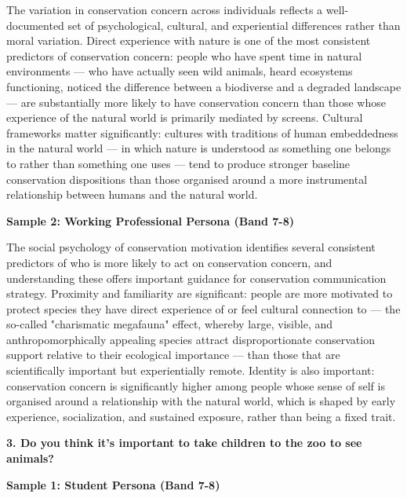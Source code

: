 The variation in conservation concern across individuals reflects a well-documented set of psychological, cultural, and experiential differences rather than moral variation. Direct experience with nature is one of the most consistent predictors of conservation concern: people who have spent time in natural environments — who have actually seen wild animals, heard ecosystems functioning, noticed the difference between a biodiverse and a degraded landscape — are substantially more likely to have conservation concern than those whose experience of the natural world is primarily mediated by screens. Cultural frameworks matter significantly: cultures with traditions of human embeddedness in the natural world — in which nature is understood as something one belongs to rather than something one uses — tend to produce stronger baseline conservation dispositions than those organised around a more instrumental relationship between humans and the natural world.

\textbf{Sample 2: Working Professional Persona (Band 7-8)}

The social psychology of conservation motivation identifies several consistent predictors of who is more likely to act on conservation concern, and understanding these offers important guidance for conservation communication strategy. Proximity and familiarity are significant: people are more motivated to protect species they have direct experience of or feel cultural connection to — the so-called "charismatic megafauna" effect, whereby large, visible, and anthropomorphically appealing species attract disproportionate conservation support relative to their ecological importance — than those that are scientifically important but experientially remote. Identity is also important: conservation concern is significantly higher among people whose sense of self is organised around a relationship with the natural world, which is shaped by early experience, socialization, and sustained exposure, rather than being a fixed trait.

\separator

\begin{ieltsquestion}
\textbf{3. Do you think it's important to take children to the zoo to see animals?}
\end{ieltsquestion}
\textbf{Sample 1: Student Persona (Band 7-8)}

